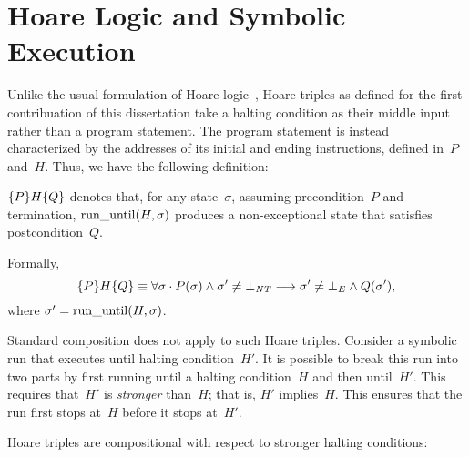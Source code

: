 \section{Hoare Logic and Symbolic Execution}
Unlike the usual formulation of Hoare logic~\citep{hoare1969axiomatic,myreen2007hoare},
Hoare triples as defined for the first contribuation of this dissertation
take a halting condition
as their middle input rather than a program statement.
The program statement is instead characterized by the addresses of its initial
and ending instructions, defined in~$P$ and~$H$.
Thus, we have the following definition:
\begin{definition}\label{def:htriple}
  $\htriple{P}{H}{Q}$
  denotes that, for any state~$\sigma$, assuming precondition~$P$ and termination,
  $\run(H,\sigma)$ produces a non-exceptional state that satisfies postcondition~$Q$.
  
  Formally,
  \begin{equation}
    \htriple{P}{H}{Q}\equiv\forall\sigma\cdot
    P(\sigma)\wedge\sigma'\neq\bot_{\var{NT}}\longrightarrow
    \sigma'\neq\bot_E\wedge Q(\sigma'),
  \end{equation}
  where $\sigma'=\run(H,\sigma)$.
\end{definition}
 
Standard composition does not apply to such Hoare triples.
Consider a symbolic run that executes until halting condition~$H'$.
It is possible to break this run into two parts
by first running until a halting condition~$H$ and then until~$H'$.
This requires that~$H'$ is \emph{stronger} than~$H$; that is, $H'$ implies~$H$.
This ensures that the run first stops at~$H$ before it stops at~$H'$.
\begin{theorem}\label{thm:comp}
  Hoare triples are compositional with respect to stronger halting conditions:
  \begin{prooftree}
  \end{prooftree}
\end{theorem}

